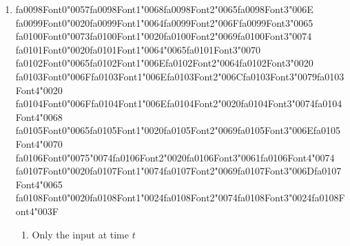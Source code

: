 \documentclass[12pt]{article}
\begin{document}
\begin{enumerate}[label=Q\arabic*.]
\begin{enumerate}[label=(\Alph*)]
    \item The next word given the predicted history
    \item The next word given the ground-truth history
    \item The current word given itself
    \item All words simultaneously
\end{enumerate}
\item {\csname fa0098Font0\endcsname\char"0057}{\csname fa0098Font1\endcsname\char"0068}{\csname fa0098Font2\endcsname\char"0065}{\csname fa0098Font3\endcsname\char"006E} {\csname fa0099Font0\endcsname\char"0020}{\csname fa0099Font1\endcsname\char"0064}{\csname fa0099Font2\endcsname\char"006F}{\csname fa0099Font3\endcsname\char"0065} {\csname fa0100Font0\endcsname\char"0073}{\csname fa0100Font1\endcsname\char"0020}{\csname fa0100Font2\endcsname\char"0069}{\csname fa0100Font3\endcsname\char"0074} {\csname fa0101Font0\endcsname\char"0020}{\csname fa0101Font1\endcsname\char"0064}{\char"0065}{\csname fa0101Font3\endcsname\char"0070} {\csname fa0102Font0\endcsname\char"0065}{\csname fa0102Font1\endcsname\char"006E}{\csname fa0102Font2\endcsname\char"0064}{\csname fa0102Font3\endcsname\char"0020} {\csname fa0103Font0\endcsname\char"006F}{\csname fa0103Font1\endcsname\char"006E}{\csname fa0103Font2\endcsname\char"006C}{\csname fa0103Font3\endcsname\char"0079}{\csname fa0103Font4\endcsname\char"0020} {\csname fa0104Font0\endcsname\char"006F}{\csname fa0104Font1\endcsname\char"006E}{\csname fa0104Font2\endcsname\char"0020}{\csname fa0104Font3\endcsname\char"0074}{\csname fa0104Font4\endcsname\char"0068} {\csname fa0105Font0\endcsname\char"0065}{\csname fa0105Font1\endcsname\char"0020}{\csname fa0105Font2\endcsname\char"0069}{\csname fa0105Font3\endcsname\char"006E}{\csname fa0105Font4\endcsname\char"0070} {\csname fa0106Font0\endcsname\char"0075}{\char"0074}{\csname fa0106Font2\endcsname\char"0020}{\csname fa0106Font3\endcsname\char"0061}{\csname fa0106Font4\endcsname\char"0074} {\csname fa0107Font0\endcsname\char"0020}{\csname fa0107Font1\endcsname\char"0074}{\csname fa0107Font2\endcsname\char"0069}{\csname fa0107Font3\endcsname\char"006D}{\csname fa0107Font4\endcsname\char"0065} {\csname fa0108Font0\endcsname\char"0020}{\csname fa0108Font1\endcsname\char"0024}{\csname fa0108Font2\endcsname\char"0074}{\csname fa0108Font3\endcsname\char"0024}{\csname fa0108Font4\endcsname\char"003F}
\begin{enumerate}[label=(\Alph*)]
    \item Only the input at time $t$

\end{enumerate}
\end{enumerate}
\end{document}
